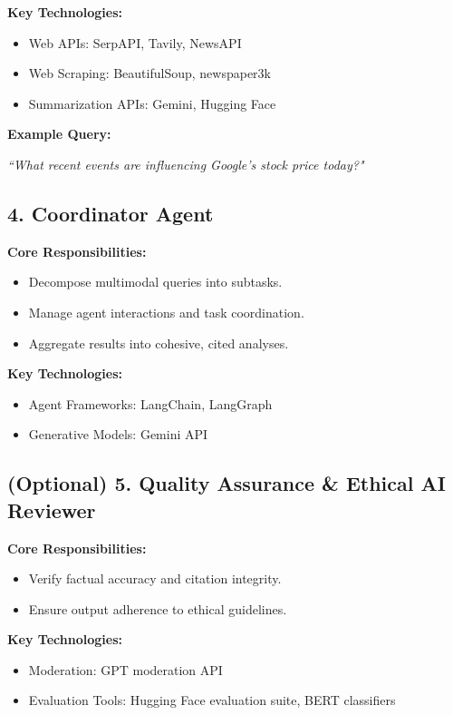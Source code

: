 \documentclass[12pt]{article}
\begin{document}
\textbf{Key Technologies:}
\begin{itemize}[noitemsep]
    \item Web APIs: SerpAPI, Tavily, NewsAPI
    \item Web Scraping: BeautifulSoup, newspaper3k
    \item Summarization APIs: Gemini, Hugging Face
\end{itemize}

\textbf{Example Query:}

\textit{``What recent events are influencing Google's stock price today?"}

\subsection*{4. Coordinator Agent}

\textbf{Core Responsibilities:}
\begin{itemize}[noitemsep]
    \item Decompose multimodal queries into subtasks.
    \item Manage agent interactions and task coordination.
    \item Aggregate results into cohesive, cited analyses.
\end{itemize}

\textbf{Key Technologies:}
\begin{itemize}[noitemsep]
    \item Agent Frameworks: LangChain, LangGraph
    \item Generative Models: Gemini API
\end{itemize}

\subsection*{(Optional) 5. Quality Assurance \& Ethical AI Reviewer}

\textbf{Core Responsibilities:}
\begin{itemize}[noitemsep]
    \item Verify factual accuracy and citation integrity.
    \item Ensure output adherence to ethical guidelines.
\end{itemize}

\textbf{Key Technologies:}
\begin{itemize}[noitemsep]
    \item Moderation: GPT moderation API
    \item Evaluation Tools: Hugging Face evaluation suite, BERT classifiers
\end{itemize}
\end{document}
